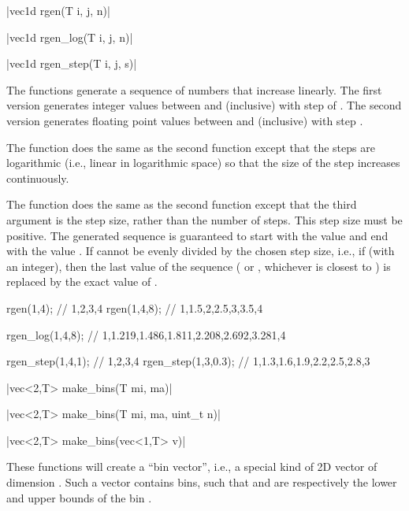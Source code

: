 \funcitem \cppinline|vec1d rgen(T i, j, n)| 

\cppinline|vec1d rgen_log(T i, j, n)| 

\cppinline|vec1d rgen_step(T i, j, s)| 

The  functions generate a sequence of numbers that increase linearly. The first version generates integer values between  and  (inclusive) with step of . The second version generates  floating point values between  and  (inclusive) with step .

The  function does the same as the second  function except that the steps are logarithmic (i.e., linear in logarithmic space) so that the size of the step increases continuously.

The  function does the same as the second  function except that the third argument is the step size, rather than the number of steps. This step size must be positive. The generated sequence is guaranteed to start with the value  and end with the value . If  cannot be evenly divided by the chosen step size, i.e., if  (with  an integer), then the last value of the sequence ( or , whichever is closest to ) is replaced by the exact value of .

\begin{example}
\begin{cppcode}
rgen(1,4); // {1,2,3,4}
rgen(1,4,8); // {1,1.5,2,2.5,3,3.5,4}

rgen_log(1,4,8); // {1,1.219,1.486,1.811,2.208,2.692,3.281,4}

rgen_step(1,4,1); // {1,2,3,4}
rgen_step(1,3,0.3); // {1,1.3,1.6,1.9,2.2,2.5,2.8,3}
\end{cppcode}
\end{example}

\funcitem \cppinline|vec<2,T> make_bins(T mi, ma)| 

\cppinline|vec<2,T> make_bins(T mi, ma, uint_t n)|

\cppinline|vec<2,T> make_bins(vec<1,T> v)|

These functions will create a ``bin vector'', i.e., a special kind of 2D vector of dimension \cppinline{[2,n]}. Such a vector contains  bins, such that  and  are respectively the lower and upper bounds of the bin .

